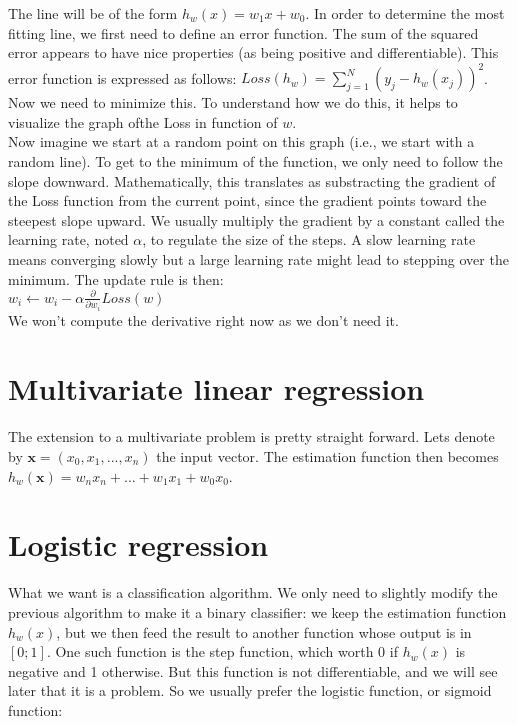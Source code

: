 \documentclass[12pt]{report}
\begin{document}
\begin{center}
\end{center}

The line will be of the form $h_w(x) = w_1x + w_0$. In order to determine the
most fitting line, we first need to define an error function. The sum of the
squared error appears to have nice properties (as being positive and
differentiable). This error function is expressed as follows:
$Loss(h_w) = \sum\limits_{j=1}^{N}(y_j - h_w(x_j))^{2}$. Now we need to minimize
this. To understand how we do this, it helps to visualize the graph ofthe Loss
in function of $w$.\\

Now imagine we start at a random point on this graph (i.e., we start with a
random line). To get to the minimum of the function, we only need to follow the
slope downward. Mathematically, this translates as substracting the gradient of
the Loss function from the current point, since the gradient points toward the
steepest slope upward. We usually multiply the gradient by a constant called the
learning rate, noted $\alpha$, to regulate the size of the steps. A slow
learning rate means converging slowly but a large learning rate might lead to
stepping over the minimum. The update rule is then:\\

$w_i \leftarrow w_i - \alpha \frac{\partial}{\partial w_i} Loss(w)$\\

We won't compute the derivative right now as we don't need it.

\section{Multivariate linear regression}

The extension to a multivariate problem is pretty straight forward. Lets denote
by $\textbf{x} = (x_0, x_1, ..., x_n)$ the input vector. The estimation function
then becomes $h_w(\textbf{x}) = w_nx_n + ... + w_1x_1 + w_0x_0$.

\section{Logistic regression}

What we want is a classification algorithm. We only need to slightly modify the
previous algorithm to make it a binary classifier: we keep the estimation
function $h_w(x)$, but we then feed the result to another function whose output
is in $[0;1]$. One such function is the step function, which worth 0 if $h_w(x)$
is negative and 1 otherwise. But this function is not differentiable, and we
will see later that it is a problem. So we usually prefer the logistic function,
or sigmoid function:\\
\end{document}
